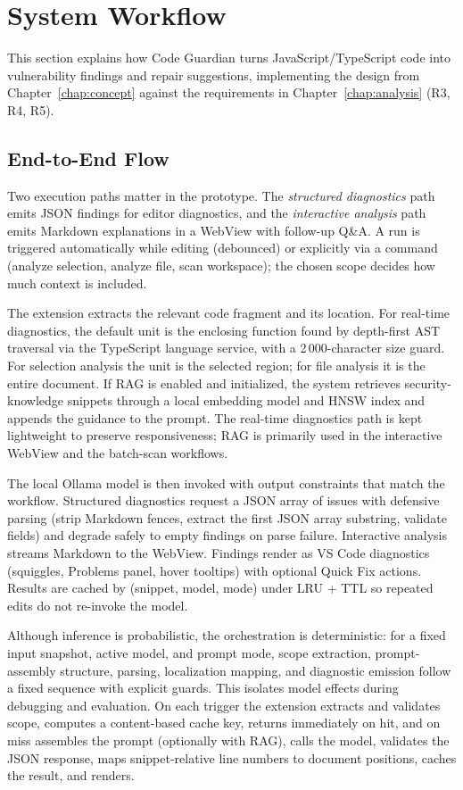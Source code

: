 \section{System Workflow}
\label{sec:impl-pipeline}

This section explains how Code Guardian turns JavaScript/TypeScript code into vulnerability findings and repair suggestions, implementing the design from Chapter~\ref{chap:concept} against the requirements in Chapter~\ref{chap:analysis} (R3, R4, R5).

\subsection{End-to-End Flow}

Two execution paths matter in the prototype. The \emph{structured diagnostics} path emits JSON findings for editor diagnostics, and the \emph{interactive analysis} path emits Markdown explanations in a WebView with follow-up Q\&A. A run is triggered automatically while editing (debounced) or explicitly via a command (analyze selection, analyze file, scan workspace); the chosen scope decides how much context is included.

The extension extracts the relevant code fragment and its location. For real-time diagnostics, the default unit is the enclosing function found by depth-first AST traversal via the TypeScript language service, with a 2\,000-character size guard. For selection analysis the unit is the selected region; for file analysis it is the entire document. If RAG is enabled and initialized, the system retrieves security-knowledge snippets through a local embedding model and HNSW index and appends the guidance to the prompt. The real-time diagnostics path is kept lightweight to preserve responsiveness; RAG is primarily used in the interactive WebView and the batch-scan workflows.

The local Ollama model is then invoked with output constraints that match the workflow. Structured diagnostics request a JSON array of issues with defensive parsing (strip Markdown fences, extract the first JSON array substring, validate fields) and degrade safely to empty findings on parse failure. Interactive analysis streams Markdown to the WebView. Findings render as VS Code diagnostics (squiggles, Problems panel, hover tooltips) with optional Quick Fix actions. Results are cached by (snippet, model, mode) under LRU + TTL so repeated edits do not re-invoke the model.

Although inference is probabilistic, the orchestration is deterministic: for a fixed input snapshot, active model, and prompt mode, scope extraction, prompt-assembly structure, parsing, localization mapping, and diagnostic emission follow a fixed sequence with explicit guards. This isolates model effects during debugging and evaluation. On each trigger the extension extracts and validates scope, computes a content-based cache key, returns immediately on hit, and on miss assembles the prompt (optionally with RAG), calls the model, validates the JSON response, maps snippet-relative line numbers to document positions, caches the result, and renders.

